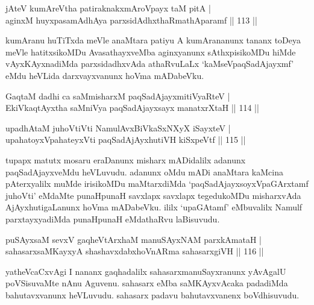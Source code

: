 \begin{shl}
jAteV kumAreV\s tha patiraknakxmAroVpayx taM pitA | \\
aginxM huyxpasamAdhAya parxsidAdhxthaRmathAparamf \hfill|| 113 || 
\end{shl}

\begin{artha}
kumAranu huTiTxda meVle anaMtara patiyu A kumArananunx tananx toDeya 
meVle hatitxsikoMDu AvasathayxveMba aginxyanunx sAthxpisikoMDu hiMde 
vAyxKAyxnadiMda parxsidadhxvAda athaRvuLaLx `kaMseVpaqSadAjayxmf' eMdu 
heVLida darxvayxvanunx hoVma mADabeVku.
\end{artha}


\begin{shl}
GaqtaM dadhi ca saMmisharxM paqSadAjayxmitiVyaRteV | \\
EkiVkaqtAyxtha saMniVya paqSadAjayxsayx manatxrXtaH \hfill|| 114 || 
\end{shl}

\begin{shl}
upadhAtaM juhoVtiVti NamulAvx\s \s BiVkaSxNXyX iSayxteV | \\
upahatoyxVpahateyxVti paqSadAjAyxhutiVH kiSxpeVtf \hfill|| 115 || 
\end{shl}

\begin{artha}
tupapx matutx mosaru eraDanunx misharx mADidalilx adanunx 
paqSadAjayxveMdu heVLuvudu. adanunx oMdu mADi anaMtara kaMcina 
pAterxyalilx muMde irisikoMDu maMtarxdiMda `paqSadAjayxsoyxVpaGArxtamf 
juhoVti' eMdaMte punaHpunaH savxlapx savxlapx tegedukoMDu misharxvAda AjAyxhutigaLanunx hoVma mADabeVku. ililx `upaGAtamf' eMbuvalilx Namulf 
parxtayxyadiMda punaHpunaH eMdathaRvu laBisuvudu.
\end{artha}

\begin{shl}
puSAyxsaM sevxV gaqheV\s tArxhaM manuSAyxNAM parxkAmataH | \\
sahasarxsaMKayxyA shashavxdabxhoVnARma sahasarxgiVH \hfill|| 116 || 
\end{shl}

\begin{artha}
yatheVcaCxvAgi I nananx gaqhadalilx sahasarxmanuSayxranunx yAvAgalU 
poVSisu\-vaMte nAnu Aguvenu. sahasarx eMba saMKAyxvAcaka padadiMda 
bahutavxvanunx heVLuvudu. sahasarx padavu bahutavxvanenx boVdhisuvudu.
\end{artha}

